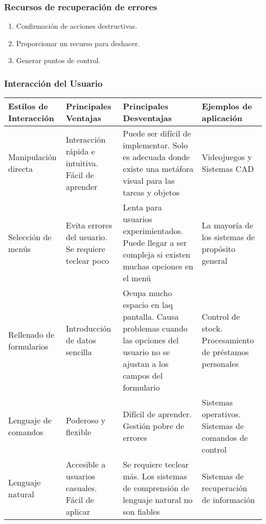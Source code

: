 \subsubsection{Recursos de recuperación de errores}
\begin{enumerate}
\item Confirmación de acciones destructivas.
\item Proporcionar un recurso para deshacer.
\item Generar puntos de control.
\end{enumerate}
\subsubsection{Interacción del Usuario}
\begin{tabu}{|p{3cm}|p{3cm}|p{5cm}|p{3cm}|}
\hline
Estilos de Interacción &
Principales Ventajas &
Principales Desventajas &
Ejemplos de aplicación\\
\hline
Manipulación directa &
Interacción rápida e intuitiva. Fácil de aprender &
Puede ser difícil de implementar. Solo es adecuada donde existe una metáfora visual para las tareas y objetos &
Videojuegos y Sistemas CAD\\[2pt]
Selección de menús &
Evita errores del usuario. Se requiere teclear poco &
Lenta para usuarios experimientados. Puede llegar a ser compleja si existen muchas opciones en el menú &
La mayoría de los sistemas de propósito general\\[2pt]
Rellenado de formularios &
Introducción de datos sencilla &
Ocupa mucho espacio en laq pantalla. Causa problemas cuando las opciones del usuario no se ajustan a los campos del formulario &
Control de stock. Procesamiento de préstamos personales\\[2pt]
Lenguaje de comandos &
Poderoso y flexible &
Difícil de aprender. Gestión pobre de errores &
Sistemas operativos. Sistemas de comandos de control\\[2pt]
Lenguaje natural &
Accesible a usuarios casuales. Fácil de aplicar &
Se requiere teclear más. Los sistemas de comprensión de lenguaje natural no son fiables &
Sistemas de recuperación de información\\[2pt]
\hline
\end{tabu}
